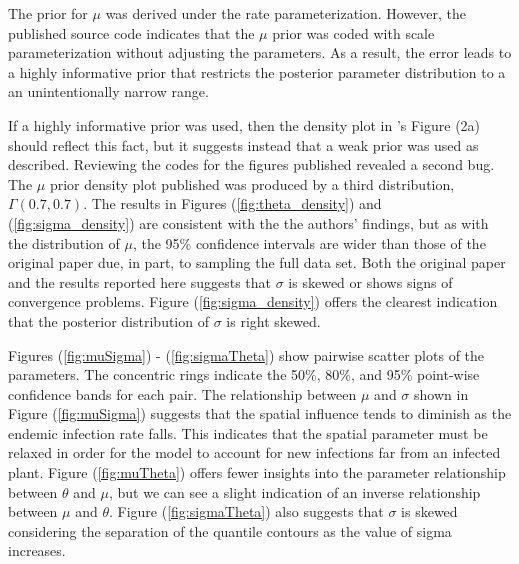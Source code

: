 \documentclass{uwstat572}
\begin{document}
The prior for $\mu$ was derived under the rate parameterization. 
However, the published source code indicates that the $\mu$ prior was coded with scale parameterization without adjusting the parameters.
As a result, the error leads to a highly informative prior that restricts the posterior parameter distribution to a an unintentionally narrow range.

If a highly informative prior was used, then the density plot in \citet{Brown}'s Figure (2a) should reflect this fact, but it suggests instead that a weak prior was used as described. 
Reviewing the codes for the figures published revealed a second bug. 
The  $\mu$ prior density plot published was produced by a third distribution, $\Gamma(0.7, 0.7)$. 
The results in Figures (\ref{fig:theta_density}) and (\ref{fig:sigma_density}) are consistent with the the authors' findings, but as with the distribution of $\mu$, the 95\% confidence intervals are wider than those of the original paper due, in part, to sampling the full data set. 
Both the original paper and the results reported here suggests that $\sigma$ is skewed or shows signs of convergence problems.
Figure (\ref{fig:sigma_density}) offers the clearest indication that the posterior distribution of $\sigma$ is right skewed. 

Figures (\ref{fig:muSigma}) - (\ref{fig:sigmaTheta}) show pairwise scatter plots of the parameters. 
The concentric rings indicate the 50\%, 80\%, and 95\% point-wise confidence bands for each pair.
The relationship between $\mu$ and $\sigma$ shown in Figure (\ref{fig:muSigma}) suggests that the spatial influence tends to diminish as the endemic infection rate falls. 
This indicates that the spatial parameter must be relaxed in order for the model to account for new infections far from an infected plant. 
Figure (\ref{fig:muTheta}) offers fewer insights into the parameter relationship between $\theta$ and $\mu$, but we can see a slight indication of an inverse relationship between $\mu$ and $\theta$. 
Figure (\ref{fig:sigmaTheta}) also suggests that $\sigma$ is skewed considering the separation of the quantile contours as the value of sigma increases. 
\end{document}

